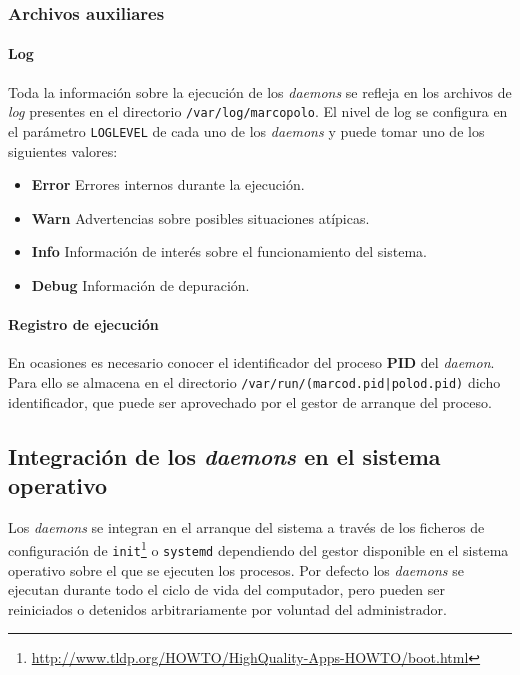 
\subsubsection{Archivos auxiliares}

\paragraph{Log}
Toda la información sobre la ejecución de los \textit{daemons} se refleja en los archivos de \textit{log} presentes en el directorio \texttt{/var/log/marcopolo}. El nivel de log se configura en el parámetro \texttt{LOGLEVEL} de cada uno de los \textit{daemons} y puede tomar uno de los siguientes valores:

\begin{itemize}
\item \textbf{Error} Errores internos durante la ejecución.
\item \textbf{Warn} Advertencias sobre posibles situaciones atípicas.
\item \textbf{Info} Información de interés sobre el funcionamiento del sistema.
\item \textbf{Debug} Información de depuración.
\end{itemize}


\paragraph{Registro de ejecución}

En ocasiones es necesario conocer el identificador del proceso \textbf{PID} del \textit{daemon}. Para ello se almacena en el directorio \texttt{/var/run/(marcod.pid|polod.pid)} dicho identificador, que puede ser aprovechado por el gestor de arranque del proceso.

\subsection{Integración de los \textit{daemons} en el sistema operativo}

Los \textit{daemons} se integran en el arranque del sistema a través de los ficheros de configuración de \texttt{init}\footnote{\href{http://www.tldp.org/HOWTO/HighQuality-Apps-HOWTO/boot.html}{http://www.tldp.org/HOWTO/HighQuality-Apps-HOWTO/boot.html}} o \texttt{systemd} dependiendo del gestor disponible en el sistema operativo sobre el que se ejecuten los procesos. Por defecto los \textit{daemons} se ejecutan durante todo el ciclo de vida del computador, pero pueden ser reiniciados o detenidos arbitrariamente por voluntad del administrador.

